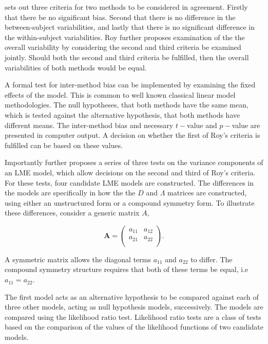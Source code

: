 \documentclass[MAIN.tex]{subfiles}
\begin{document}
	\citet{roy} sets out three criteria for two methods to be considered in agreement. Firstly that there be no significant bias. Second that there is no difference in the between-subject variabilities, and lastly that there is no significant difference in the within-subject variabilities. Roy further proposes examination of the the overall variability by considering the second and third criteria be examined jointly. Should both the second and third criteria be fulfilled, then the overall variabilities of both methods would be equal.
	
	A formal test for inter-method bias can be implemented by examining the fixed effects of the model. This is common to well known classical linear model methodologies. The null hypotheses, that both methods have the same mean, which is tested against the alternative hypothesis, that both methods have different means.
	The inter-method bias and necessary $t-$value and $p-$value are presented in computer output. A decision on whether the first of Roy's criteria is fulfilled can be based on these values.
	
	Importantly \citet{roy} further proposes a series of three tests on the variance components of an LME model, which allow decisions on the second and third of Roy's criteria. For these tests, four candidate LME models are constructed. The differences in the models are specifically in how the the $D$ and $\Lambda$ matrices are constructed, using either an unstructured form or a compound symmetry form. To illustrate these differences, consider a generic matrix $A$,
	
	\[
	\boldsymbol{A} = \left( \begin{array}{cc}
	a_{11} & a_{12}  \\
	a_{21} & a_{22}  \\
	\end{array}\right).
	\]
	
	A symmetric matrix allows the diagonal terms $a_{11}$ and $a_{22}$ to differ. The compound symmetry structure requires that both of these terms be equal, i.e $a_{11} = a_{22}$.
	
	The first model acts as an alternative hypothesis to be compared against each of three other models, acting as null hypothesis models, successively. The models are compared using the likelihood ratio test. Likelihood ratio tests are a class of tests based on the comparison of the values of the likelihood functions of two candidate models. 
	
	
	
\end{document}
